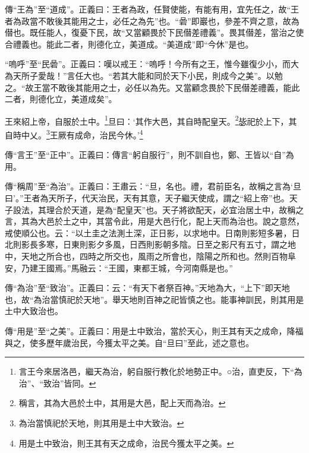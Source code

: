 {\noindent\zhuan{}\fzbyks 傳“王為”至“道成”。正義曰：王者為政，任賢使能，有能有用，宜先任之，故“王者為政當不敢後其能用之士，必任之為先”也。“碞”即巖也，參差不齊之意，故為僣也。既任能人，復憂下民，故“又當顧畏於下民僣差禮義”。畏其僣差，當治之使合禮義也。能此二者，則德化立，美道成。“美道成”即“今休”是也。 \par}

{\noindent\shu{}\fzkt “嗚呼”至“民碞”。正義曰：嘆以戒王：“嗚呼！今所有之王，惟今雖復少小，而大為天所子愛哉！”言任大也。“若其大能和同於天下小民，則成今之美”。以勉之。“故王當不敢後其能用之士，必任以為先。又當顧念畏於下民僣差禮義，能此二者，則德化立，美道成矣”。 \par}

王來紹上帝，自服於土中。\footnote{言王今來居洛邑，繼天為治，躬自服行教化於地勢正中。○治，直吏反，下“為治”、“致治”皆同。}旦曰：‘其作大邑，其自時配皇天。\footnote{稱言，其為大邑於土中，其用是大邑，配上天而為治。}毖祀於上下，其自時中乂。\footnote{為治當慎祀於天地，則其用是土中大致治。}王厥有成命，治民今休。’\footnote{用是土中致治，則王其有天之成命，治民今獲太平之美。}


{\noindent\zhuan{}\fzbyks 傳“言王”至“正中”。正義曰：傳言“躬自服行”，則不訓自也，鄭、王皆以“自”為用。 \par}

{\noindent\zhuan{}\fzbyks 傳“稱周”至“為治”。正義曰：王肅云：“旦，名也。禮，君前臣名，故稱之言為‘旦曰’。”王者為天所子，代天治民，天有其意，天子繼天使成，謂之“紹上帝”也。天子設法，其理合於天道，是為“配皇天”也。天子將欲配天，必宜治居土中，故稱之言，其為大邑於土之中，其當令此，用是大邑行化，配上天而為治也。說之意然，戒使順公也。云：“以土圭之法測土深，正日影，以求地中。日南則影短多暑，日北則影長多寒，日東則影夕多風，日西則影朝多陰。日至之影尺有五寸，謂之地中，天地之所合也，四時之所交也，風雨之所會也，陰陽之所和也。然則百物阜安，乃建王國焉。”馬融云：“王國，東都王城，今河南縣是也。” \par}

{\noindent\zhuan{}\fzbyks 傳“為治”至“致治”。正義曰：云：“有天下者祭百神。”天地為大，“上下”即天地也，故“為治當慎祀於天地”。舉天地則百神之祀皆慎之也。能事神訓民，則其用是土中大致治也。 \par}

{\noindent\zhuan{}\fzbyks 傳“用是”至“之美”。正義曰：用是土中致治，當於天心，則王其有天之成命，降福與之，使多歷年歲治民，今獲太平之美。自“旦曰”至此，述之意也。 \par}

